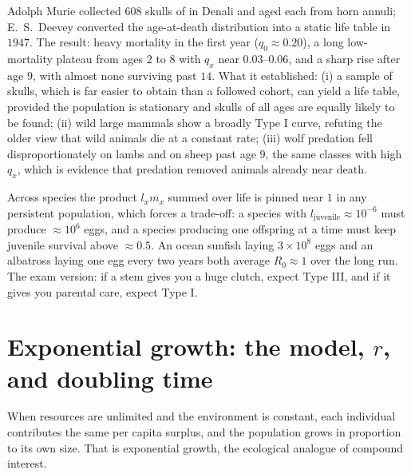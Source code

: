 \begin{expbox}[title={EXPERIMENT: Murie's Dall sheep skulls, 1944, and Deevey's reanalysis}]
Adolph Murie collected $608$ skulls of  in Denali and aged each
from horn annuli; E.~S.~Deevey converted the age-at-death distribution into a
static life table in $1947$. The result: heavy mortality in the first year
($q_0\approx 0.20$), a long low-mortality plateau from ages $2$ to $8$ with
$q_x$ near $0.03$--$0.06$, and a sharp rise after age $9$, with almost none
surviving past $14$. What it established: (i) a sample of skulls, which is far
easier to obtain than a followed cohort, can yield a life table, provided the
population is stationary and skulls of all ages are equally likely to be found;
(ii) wild large mammals show a broadly Type I curve, refuting the older view that
wild animals die at a constant rate; (iii) wolf predation fell disproportionately
on lambs and on sheep past age $9$, the same classes with high $q_x$, which is
evidence that predation removed animals already near death.
\end{expbox}

\begin{obsbox}[title={WORTH NOTICING: fecundity and survivorship trade off}]
Across species the product $l_x m_x$ summed over life is pinned near $1$ in any
persistent population, which forces a trade-off: a species with
$l_{\text{juvenile}}\approx 10^{-6}$ must produce $\approx 10^{6}$ eggs, and a
species producing one offspring at a time must keep juvenile survival above
$\approx 0.5$. An ocean sunfish laying $3\times 10^{8}$ eggs and an albatross
laying one egg every two years both average $R_0\approx 1$ over the long run.
The exam version: if a stem gives you a huge clutch, expect Type III, and if it
gives you parental care, expect Type I.
\end{obsbox}

\section{Exponential growth: the model, $r$, and doubling time}

When resources are unlimited and the environment is constant, each individual
contributes the same per capita surplus, and the population grows in proportion
to its own size. That is exponential growth, the ecological analogue of compound
interest.

